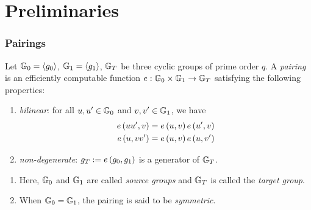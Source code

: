 \documentclass{beamer}
\begin{document}
    \section{Preliminaries}

    \begin{frame}
        \frametitle{Pairings}
        \begin{definition}
            Let \(\mathbb G_0 = \left\langle g_0 \right\rangle\), \(\mathbb G_1 = \left\langle g_1 \right\rangle\), \(\mathbb G_T\) be
            three cyclic groups of prime order \(q\). A \emph{pairing} is an
            efficiently computable function \(e: \mathbb G_0 \times \mathbb G_1 \rightarrow
            \mathbb G_T\) satisfying the following properties:
            \begin{enumerate}
                \item \emph{bilinear}: for all \(u, u^{\prime} \in \mathbb G_0\) and
                \(v, v^{\prime} \in \mathbb G_1\), we have
                \begin{align}
                    e\left(uu^{\prime}, v\right) &= e\left(u,v\right)e\left(u^{\prime},v\right) \\
                    e\left(u, vv^{\prime}\right) &= e\left(u,v\right)e\left(u, v^{\prime}\right)
                \end{align}
                \item \emph{non-degenerate}: \(g_T := e\left(g_0, g_1\right)\) is a
                generator of \(\mathbb G_T\).
            \end{enumerate}
        \end{definition}
        \begin{enumerate}
            \item<2-> Here, \(\mathbb G_0\) and \(\mathbb G_1\) are called \emph{source
            groups} and \(\mathbb G_T\) is called the \emph{target group}.
            \item<3-> When \(\mathbb G_0 = \mathbb G_1\), the pairing is said to be
            \emph{symmetric}.
        \end{enumerate}
    \end{frame}
\end{document}
